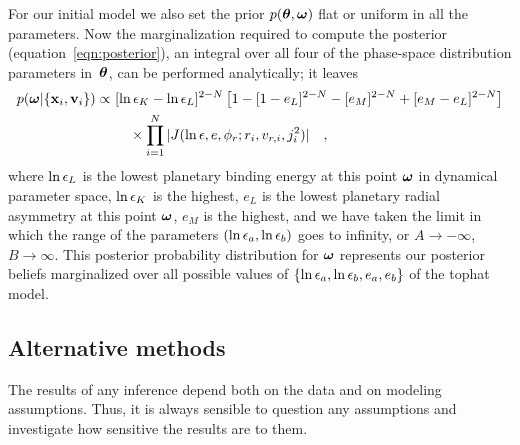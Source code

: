 For our initial model we also set the prior $p(\boldsymbol{{\theta}},\boldsymbol{{\omega}})$
flat or uniform in all the parameters. Now the marginalization
required to compute the posterior (equation~\ref{eqn:posterior}), an
integral over all four of the phase-space distribution parameters
in~$\boldsymbol{{\theta}}$, can be performed analytically; it leaves
\begin{equation}\label{eq:basic_posterior}
\begin{split}
p(\boldsymbol{{\omega}} | \{\boldsymbol{\mathbf{x}}_i,\boldsymbol{\mathbf{v}}_i\}) \propto\,\,
  & [\ln{\epsilon}_K - \ln{\epsilon}_L]^{2-N}
    \left[1-[1-e_L]^{2-N}-[e_M]^{2-N} + [e_M-e_L]^{2-N}\right]\\
  & \quad\times\prod_{i=1}^N
    |J(\ln{\epsilon},e,\phi_r;r_i,v_{r,i},j_i^2)|\quad ,
\end{split}
\end{equation}
where $\ln{\epsilon}_L$ is the lowest planetary binding energy at this
point $\boldsymbol{{\omega}}$ in dynamical parameter space, $\ln{\epsilon}_K$ is the
highest, $e_L$ is the lowest planetary radial asymmetry at this point
$\boldsymbol{{\omega}}$, $e_M$ is the highest, and we have taken the limit in which
the range of the parameters $(\ln{\epsilon}_a,\ln{\epsilon}_b)$ goes to
infinity, or $A \rightarrow -\infty$, $B \rightarrow \infty$. This
posterior probability distribution for $\boldsymbol{{\omega}}$ represents our
posterior beliefs marginalized over all possible values of
$\{\ln{\epsilon}_a,\ln{\epsilon}_b,e_a,e_b\}$ of the tophat model.


\subsection{Alternative methods}
\label{sec:altmethods}

The results of any inference depend both on the data and on modeling
assumptions. Thus, it is always sensible to question any assumptions
and investigate how sensitive the results are to them.

